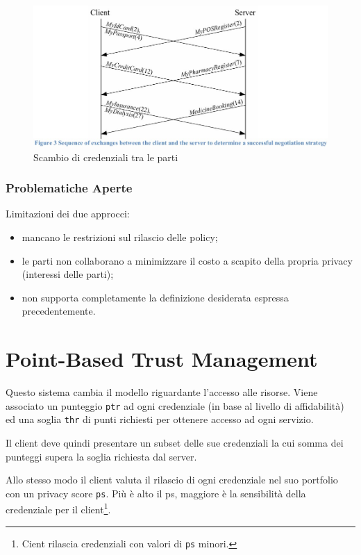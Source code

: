 \begin{figure}[ht]
    \centering
    \includegraphics[width=0.8\linewidth]{paper_user-privacy-preferences/00_pref_policy_exchange.jpg}
    \caption{Scambio di credenziali tra le parti}
    \label{fig:pref_policy_exchange}
\end{figure}

\subsubsection{Problematiche Aperte}
Limitazioni dei due approcci: \begin{itemize}
    \item mancano le restrizioni sul rilascio delle policy;
    \item le parti non collaborano a minimizzare il costo a scapito della propria privacy (interessi delle parti);
    \item non supporta completamente la definizione desiderata espressa precedentemente.
\end{itemize}




\section{Point-Based Trust Management}
Questo sistema cambia il modello riguardante l'accesso alle risorse.
Viene associato un punteggio \texttt{ptr} ad ogni credenziale (in base al livello di affidabilità) ed una soglia \texttt{thr} di punti richiesti per ottenere accesso ad ogni servizio.

Il client deve quindi presentare un subset delle sue credenziali la cui somma dei punteggi supera la soglia richiesta dal server.

Allo stesso modo il client valuta il rilascio di ogni credenziale nel suo portfolio con un privacy score \texttt{ps}. Più è alto il ps, maggiore è la sensibilità della credenziale per il client\footnote{Cient rilascia credenziali con valori di \texttt{ps} minori.}.


